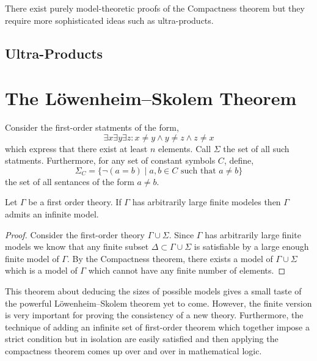 \documentclass[12pt]{article}
\begin{document}
\begin{remark}
There exist purely model-theoretic proofs of the Compactness theorem but they require more sophisticated ideas such as ultra-products.
\end{remark}


\subsection{Ultra-Products}

\section{The L\"{o}wenheim–Skolem Theorem}

\begin{definition}
Consider the first-order statments of the form,
\[ \exists x \exists y \exists z : x \neq y \wedge y \neq z \wedge z \neq x \]
which express that there exist at least $n$ elements. Call $\Sigma$ the set of all such statments. Furthermore, for any set of constant symbols $C$, define,
\[ \Sigma_C = \{ \neg (a = b) \mid a, b \in C \text{ such that } a \neq b \} \]
the set of all sentances of the form $a \neq b$.
\end{definition}

\begin{theorem}
Let $\Gamma$ be a first order theory. If $\Gamma$ has arbitrarily large finite modeles then $\Gamma$ admits an infinite model.
\end{theorem}

\begin{proof}
Consider the first-order theory $\Gamma \cup \Sigma$. Since $\Gamma$ has arbitrarily large finite models we know that any finite subset $\Delta \subset \Gamma \cup \Sigma$ is satisfiable by a large enough finite model of $\Gamma$. By the Compactness theorem, there exists a model of $\Gamma \cup \Sigma$ which is a model of $\Gamma$ which cannot have any finite number of elements. 
\end{proof}

\begin{remark}
This theorem about deducing the sizes of possible models gives a small taste of the powerful L\"{o}wenheim–Skolem theorem yet to come. However, the finite version is very important for proving the consistency of a new theory. Furthermore, the technique of adding an infinite set of first-order theorem which together impose a strict condition but in isolation are easily satisfied and then applying the compactness theorem comes up over and over in mathematical logic. 
\end{remark}
\end{document}

